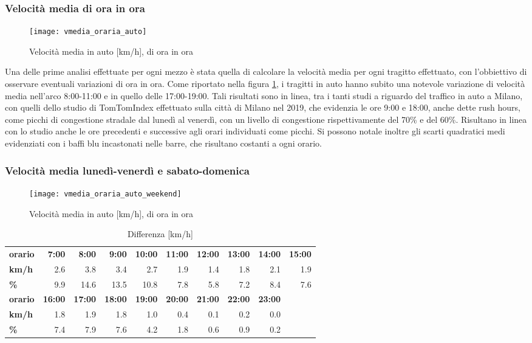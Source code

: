 \subsubsection{Velocità media di ora in ora}

\begin{figure}[H]
\texttt{[image: vmedia\_oraria\_auto]}
\caption{Velocità media in auto [km/h], di ora in ora}
\label{image:3}
\end{figure}

Una delle prime analisi effettuate per ogni mezzo è stata quella di calcolare la velocità media per ogni tragitto effettuato, con l'obbiettivo di osservare eventuali variazioni di ora in ora. Come riportato nella figura \ref{image:3}, i tragitti in auto hanno subito una notevole variazione di velocità media nell'arco 8:00-11:00 e in quello delle 17:00-19:00. Tali risultati sono in linea, tra i tanti studi a riguardo del traffico in auto a Milano, con quelli dello studio di TomTomIndex\cite{tomtomindexmilan} effettuato sulla città di Milano nel 2019, che evidenzia le ore 9:00 e 18:00, anche dette rush hours, come picchi di congestione stradale dal lunedì al venerdì, con un livello di congestione rispettivamente del 70\% e del 60\%. Risultano in linea con lo studio anche le ore precedenti e successive agli orari individuati come picchi. Si possono notale inoltre gli scarti quadratici medi evidenziati con i baffi blu incastonati nelle barre, che risultano costanti a ogni orario.

\subsubsection{Velocità media lunedì-venerdì e sabato-domenica}

\begin{figure}[H]
\texttt{[image: vmedia\_oraria\_auto\_weekend]}
\caption{Velocità media in auto [km/h], di ora in ora}
\label{image:4}
\end{figure}

\begin{table}[H]
\centering
\begin{tabular}{ | l r r r r r r r r r | }
\hline
\textbf{orario} & \textbf{7:00} & \textbf{8:00} & \textbf{9:00} & \textbf{10:00} & \textbf{11:00} & \textbf{12:00} & \textbf{13:00} & \textbf{14:00} & \textbf{15:00} \\
\textbf{km/h}& 2.6 & 3.8 & 3.4 & 2.7 & 1.9 & 1.4 & 1.8 & 2.1 & 1.9 \\
\textbf{\%}    & 9.9 & 14.6  & 13.5 & 10.8 & 7.8 & 5.8 & 7.2 & 8.4 & 7.6 \\
\hline
\textbf{orario} & \textbf{16:00} & \textbf{17:00} & \textbf{18:00} & \textbf{19:00} & \textbf{20:00} & \textbf{21:00} & \textbf{22:00} & \textbf{23:00} & \quad \\
\textbf{km/h}&  1.8 & 1.9 & 1.8 & 1.0 & 0.4 & 0.1 & 0.2 & 0.0 & \quad \\
\textbf{\%}    & 7.4 & 7.9 & 7.6 & 4.2 & 1.8 & 0.6 & 0.9 & 0.2 & \quad \\
\hline
\end{tabular}
\caption{Differenza [km/h]}
\label{table:8}
\end{table}


